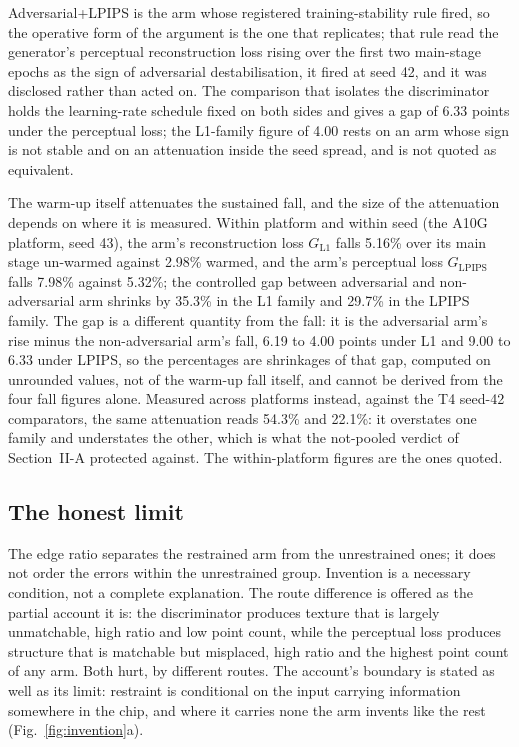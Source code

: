 Adversarial+LPIPS is the arm whose registered training-stability rule fired, so the
operative form of the argument is the one that replicates; that rule read the generator's
perceptual reconstruction loss rising over the first two main-stage epochs as the sign of
adversarial destabilisation, it fired at seed 42, and it was disclosed rather than acted
on. The comparison that isolates the discriminator
holds the learning-rate schedule fixed on both sides and gives a gap of 6.33 points under
the perceptual loss; the L1-family figure of 4.00 rests on an arm whose sign is not stable
and on an attenuation inside the seed spread, and is not quoted as equivalent.

The warm-up itself attenuates the sustained fall, and the size of the attenuation depends
on where it is measured. Within platform and within seed (the A10G platform, seed 43), the
\Lone{} arm's reconstruction loss $G_{\mathrm{L1}}$ falls 5.16\% over its main stage
un-warmed against 2.98\% warmed, and the \LPIPSonly{} arm's perceptual loss
$G_{\mathrm{LPIPS}}$ falls 7.98\% against 5.32\%; the controlled gap between adversarial and non-adversarial arm shrinks by 35.3\% in the
L1 family and 29.7\% in the LPIPS family. The gap is a different quantity from the fall:
it is the adversarial arm's rise minus the non-adversarial arm's fall, 6.19 to 4.00 points
under L1 and 9.00 to 6.33 under LPIPS, so the percentages are shrinkages of that gap, computed on unrounded values, not of the
warm-up fall itself, and cannot be derived from the four fall figures alone.
Measured across platforms instead, against the T4 seed-42 comparators, the same
attenuation reads 54.3\% and 22.1\%: it overstates one family and understates the other,
which is what the not-pooled verdict of Section~II-A protected against. The
within-platform figures are the ones quoted.

\subsection{The honest limit}

The edge ratio separates the restrained arm from the unrestrained ones; it does not order
the errors within the unrestrained group. Invention is a necessary condition, not a
complete explanation. The route difference is offered as the partial account it is: the
discriminator produces texture that is largely unmatchable, high ratio and low point
count, while the perceptual loss produces structure that is matchable but misplaced, high
ratio and the highest point count of any arm. Both hurt, by different routes. The account's boundary is stated
as well as its limit: restraint is conditional on the input carrying information
somewhere in the chip, and where it carries none the \Lone{} arm invents like the rest
(Fig.~\ref{fig:invention}a).

